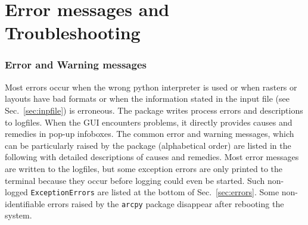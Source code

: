 \newpage
\part{Error messages and Troubleshooting} \label{part:troub}
\section{Error and Warning messages}
Most errors occur when the wrong python interpreter is used or when rasters or layouts have bad formats or when the information stated in the input file (see Sec.~\ref{sec:inpfile}) is erroneous. The package writes process errors and descriptions to logfiles. When the GUI encounters problems, it directly provides causes and remedies in pop-up infoboxes. The common error and warning messages, which can be particularly raised by the package (alphabetical order) are listed in the following with detailed descriptions of causes and remedies. Most error messages are written to the logfiles, but some exception errors are only printed to the terminal because they occur before logging could even be started. Such non-logged \texttt{ExceptionErrors} are listed at the bottom of Sec.~\ref{sec:errors}. Some non-identifiable errors raised by the \texttt{arcpy} package disappear after rebooting the system.

